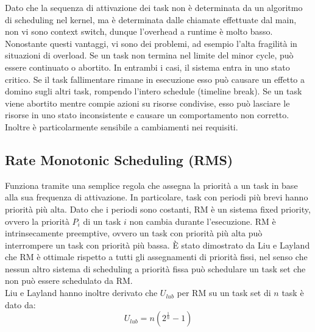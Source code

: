 \documentclass[12pt]{article}
\begin{document}
Dato che la sequenza di attivazione dei task non è determinata da un algoritmo di scheduling nel kernel, ma è determinata dalle chiamate effettuate dal main, non vi sono context switch, dunque l'overhead a runtime è molto basso.
Nonostante questi vantaggi, vi sono dei problemi, ad esempio l'alta fragilità in situazioni di overload. Se un task non termina nel limite del minor cycle, può essere continuato o abortito.
In entrambi i casi, il sistema entra in uno stato critico.
Se il task fallimentare rimane in esecuzione esso può causare un effetto a domino sugli altri task, rompendo l'intero schedule (timeline break).
Se un task viene abortito mentre compie azioni su risorse condivise, esso può lasciare le risorse in uno stato inconsistente e causare un comportamento non corretto.
Inoltre è particolarmente sensibile a cambiamenti nei requisiti.
\subsection{Rate Monotonic Scheduling (RMS)}
Funziona tramite una semplice regola che assegna la priorità a un task in base alla sua frequenza di attivazione.
In particolare, task con periodi più brevi hanno priorità più alta.
Dato che i periodi sono costanti, RM è un sistema fixed priority, ovvero la priorità $P_i$ di un task $i$ non cambia durante l'esecuzione.
RM è intrinsecamente preemptive, ovvero un task con priorità più alta può interrompere un task con priorità più bassa.
È stato dimostrato da Liu e Layland che RM è ottimale rispetto a tutti gli assegnamenti di priorità fissi, nel senso che nessun altro sistema di scheduling a priorità fissa può schedulare un task set che non può essere schedulato da RM.
\\
Liu e Layland hanno inoltre derivato che $U_{lub}$ per RM su un task set di $n$ task è dato da:
\begin{equation}
    U_{lub} = n(2^{\frac{1}{n}}-1)
\end{equation}
\end{document}
